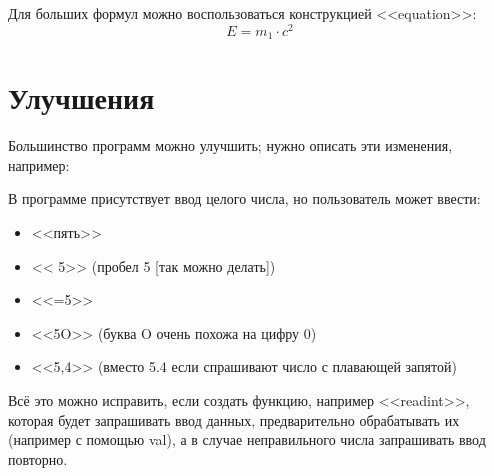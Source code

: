 Для больших формул можно воспользоваться конструкцией <<equation>>:
\begin{equation}
  E = m_1 \cdot c^2
\end{equation}







\section{Улучшения}
Большинство программ можно улучшить; нужно
описать эти изменения, например:

В программе присутствует ввод целого числа,
но пользователь может ввести:
\begin{itemize}
\item <<пять>>
\item << 5>> (пробел 5 [так можно делать])
\item <<=5>>
\item <<5O>> (буква O очень похожа на цифру 0)
\item <<5,4>> (вместо 5.4 если спрашивают число с плавающей запятой)
\end{itemize}

Всё это можно исправить, если создать функцию, например <<readint>>,
которая будет запрашивать ввод данных, предварительно обрабатывать их
(например с помощью val), а в случае неправильного числа запрашивать
ввод повторно.








